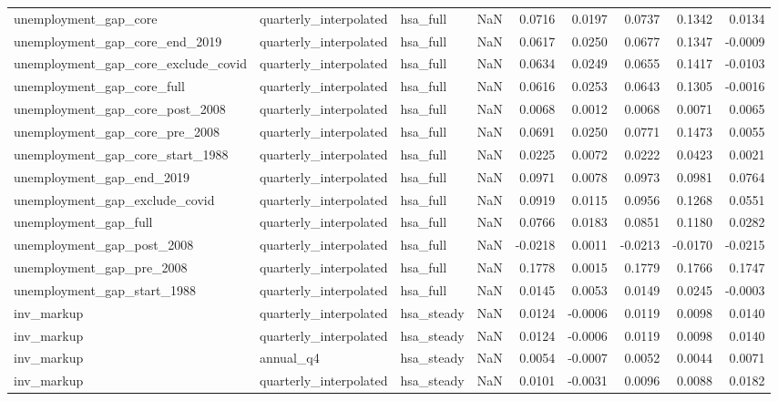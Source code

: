 \begin{tabular}{lllrrrrrr}
unemployment\_gap\_core & quarterly\_interpolated & hsa\_full & NaN & 0.0716 & 0.0197 & 0.0737 & 0.1342 & 0.0134 \\
unemployment\_gap\_core\_end\_2019 & quarterly\_interpolated & hsa\_full & NaN & 0.0617 & 0.0250 & 0.0677 & 0.1347 & -0.0009 \\
unemployment\_gap\_core\_exclude\_covid & quarterly\_interpolated & hsa\_full & NaN & 0.0634 & 0.0249 & 0.0655 & 0.1417 & -0.0103 \\
unemployment\_gap\_core\_full & quarterly\_interpolated & hsa\_full & NaN & 0.0616 & 0.0253 & 0.0643 & 0.1305 & -0.0016 \\
unemployment\_gap\_core\_post\_2008 & quarterly\_interpolated & hsa\_full & NaN & 0.0068 & 0.0012 & 0.0068 & 0.0071 & 0.0065 \\
unemployment\_gap\_core\_pre\_2008 & quarterly\_interpolated & hsa\_full & NaN & 0.0691 & 0.0250 & 0.0771 & 0.1473 & 0.0055 \\
unemployment\_gap\_core\_start\_1988 & quarterly\_interpolated & hsa\_full & NaN & 0.0225 & 0.0072 & 0.0222 & 0.0423 & 0.0021 \\
unemployment\_gap\_end\_2019 & quarterly\_interpolated & hsa\_full & NaN & 0.0971 & 0.0078 & 0.0973 & 0.0981 & 0.0764 \\
unemployment\_gap\_exclude\_covid & quarterly\_interpolated & hsa\_full & NaN & 0.0919 & 0.0115 & 0.0956 & 0.1268 & 0.0551 \\
unemployment\_gap\_full & quarterly\_interpolated & hsa\_full & NaN & 0.0766 & 0.0183 & 0.0851 & 0.1180 & 0.0282 \\
unemployment\_gap\_post\_2008 & quarterly\_interpolated & hsa\_full & NaN & -0.0218 & 0.0011 & -0.0213 & -0.0170 & -0.0215 \\
unemployment\_gap\_pre\_2008 & quarterly\_interpolated & hsa\_full & NaN & 0.1778 & 0.0015 & 0.1779 & 0.1766 & 0.1747 \\
unemployment\_gap\_start\_1988 & quarterly\_interpolated & hsa\_full & NaN & 0.0145 & 0.0053 & 0.0149 & 0.0245 & -0.0003 \\
inv\_markup & quarterly\_interpolated & hsa\_steady & NaN & 0.0124 & -0.0006 & 0.0119 & 0.0098 & 0.0140 \\
inv\_markup & quarterly\_interpolated & hsa\_steady & NaN & 0.0124 & -0.0006 & 0.0119 & 0.0098 & 0.0140 \\
inv\_markup & annual\_q4 & hsa\_steady & NaN & 0.0054 & -0.0007 & 0.0052 & 0.0044 & 0.0071 \\
inv\_markup & quarterly\_interpolated & hsa\_steady & NaN & 0.0101 & -0.0031 & 0.0096 & 0.0088 & 0.0182 \\

\end{tabular}
